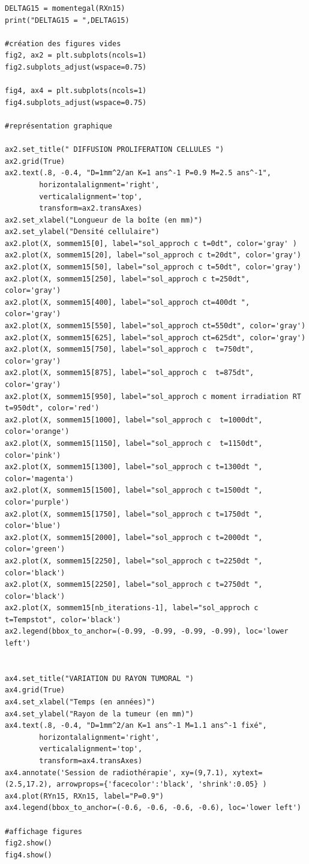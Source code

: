 \documentclass[12pt,a4paper]{article}
\begin{document}
\begin{lstlisting}[style=stylepython]
DELTAG15 = momentegal(RXn15)
print("DELTAG15 = ",DELTAG15)

#création des figures vides
fig2, ax2 = plt.subplots(ncols=1)
fig2.subplots_adjust(wspace=0.75)  

fig4, ax4 = plt.subplots(ncols=1)
fig4.subplots_adjust(wspace=0.75)

#représentation graphique

ax2.set_title(" DIFFUSION PROLIFERATION CELLULES ")
ax2.grid(True)
ax2.text(.8, -0.4, "D=1mm^2/an K=1 ans^-1 P=0.9 M=2.5 ans^-1",
        horizontalalignment='right',
        verticalalignment='top',
        transform=ax2.transAxes)
ax2.set_xlabel("Longueur de la boîte (en mm)")
ax2.set_ylabel("Densité cellulaire")
ax2.plot(X, sommem15[0], label="sol_approch c t=0dt", color='gray' )
ax2.plot(X, sommem15[20], label="sol_approch c t=20dt", color='gray')
ax2.plot(X, sommem15[50], label="sol_approch c t=50dt", color='gray')
ax2.plot(X, sommem15[250], label="sol_approch c t=250dt", color='gray')
ax2.plot(X, sommem15[400], label="sol_approch ct=400dt ", color='gray')
ax2.plot(X, sommem15[550], label="sol_approch ct=550dt", color='gray')
ax2.plot(X, sommem15[625], label="sol_approch ct=625dt", color='gray')
ax2.plot(X, sommem15[750], label="sol_approch c  t=750dt", color='gray')
ax2.plot(X, sommem15[875], label="sol_approch c  t=875dt", color='gray')
ax2.plot(X, sommem15[950], label="sol_approch c moment irradiation RT t=950dt", color='red')
ax2.plot(X, sommem15[1000], label="sol_approch c  t=1000dt", color='orange')
ax2.plot(X, sommem15[1150], label="sol_approch c  t=1150dt", color='pink')
ax2.plot(X, sommem15[1300], label="sol_approch c t=1300dt ", color='magenta')
ax2.plot(X, sommem15[1500], label="sol_approch c t=1500dt ", color='purple')
ax2.plot(X, sommem15[1750], label="sol_approch c t=1750dt ", color='blue')
ax2.plot(X, sommem15[2000], label="sol_approch c t=2000dt ", color='green')
ax2.plot(X, sommem15[2250], label="sol_approch c t=2250dt ", color='black')
ax2.plot(X, sommem15[2250], label="sol_approch c t=2750dt ", color='black')
ax2.plot(X, sommem15[nb_iterations-1], label="sol_approch c t=Tempstot", color='black')
ax2.legend(bbox_to_anchor=(-0.99, -0.99, -0.99, -0.99), loc='lower left')


ax4.set_title("VARIATION DU RAYON TUMORAL ")
ax4.grid(True)
ax4.set_xlabel("Temps (en années)")
ax4.set_ylabel("Rayon de la tumeur (en mm)")
ax4.text(.8, -0.4, "D=1mm^2/an K=1 ans^-1 M=1.1 ans^-1 fixé",
        horizontalalignment='right',
        verticalalignment='top',
        transform=ax4.transAxes)
ax4.annotate('Session de radiothérapie', xy=(9,7.1), xytext=(2.5,17.2), arrowprops={'facecolor':'black', 'shrink':0.05} )
ax4.plot(RYn15, RXn15, label="P=0.9")
ax4.legend(bbox_to_anchor=(-0.6, -0.6, -0.6, -0.6), loc='lower left')

#affichage figures 
fig2.show()
fig4.show()
\end{lstlisting}
\\
\newpage
\end{document}
